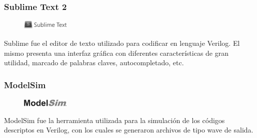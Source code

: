 \subsubsection*{Sublime Text 2}
\begin{figure}
	\vspace{-15pt}
	\begin{center}
		\includegraphics[width=0.20\textwidth]{./figures/logo_sublime.png}
	\end{center}
	\vspace{-15pt}
\end{figure}
Sublime fue el editor de texto utilizado para codificar en lenguaje Verilog. El mismo presenta una
interfaz gráfica con diferentes características de gran utilidad, marcado de palabras claves,
autocompletado, etc.

% 
\subsubsection*{ModelSim}
\begin{figure}
	\vspace{-15pt}
	\begin{center}
		\includegraphics[width=0.20\textwidth]{./figures/logo_modelsim.png}
	\end{center}
	\vspace{-15pt}
\end{figure}
ModelSim fue la herramienta utilizada para la simulación de los códigos descriptos en Verilog, con
los cuales se generaron archivos de tipo wave de salida.

